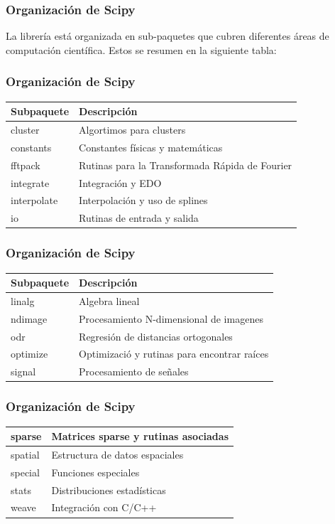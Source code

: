 \documentclass[12pt]{beamer}
\begin{document}
\begin{frame}
\frametitle{Organización de Scipy}
La librería  está organizada en sub-paquetes que cubren diferentes áreas de computación científica. Estos se resumen en la siguiente tabla:
\end{frame}
\begin{frame}
\frametitle{Organización de Scipy}
\fontsize{12}{12}\selectfont
\begin{table}
\renewcommand{\arraystretch}{0.9}
\begin{tabular}{l | l}
	Subpaquete	&	Descripción \\ \hline
	cluster		&	Algortimos para clusters \\ \hline
	constants	&	Constantes físicas y matemáticas \\ \hline
	fftpack 	&	Rutinas para la Transformada Rápida de Fourier \\ \hline
	integrate	&	Integración y EDO \\ \hline
	interpolate	&	Interpolación y uso de splines \\ \hline
	io			&	Rutinas de entrada y salida
\end{tabular}
\end{table}
\end{frame}
\begin{frame}
\frametitle{Organización de Scipy}
\fontsize{12}{12}\selectfont
\begin{table}
\renewcommand{\arraystretch}{0.9}
\begin{tabular}{l | l}
	Subpaquete	&	Descripción \\ \hline
	linalg		&	Algebra lineal \\ \hline
	ndimage		&	Procesamiento N-dimensional de imagenes \\ \hline
	odr			&	Regresión de distancias ortogonales \\ \hline
	optimize	&	Optimizació y rutinas para encontrar raíces \\ \hline
	signal		&	Procesamiento de señales \\ \hline
\end{tabular}
\end{table}
\end{frame}
\begin{frame}
\frametitle{Organización de Scipy}
\fontsize{12}{12}\selectfont
\begin{table}
\renewcommand{\arraystretch}{0.9}
\begin{tabular}{l | l}
    sparse		&	Matrices sparse y rutinas asociadas \\ \hline
    spatial		&	Estructura de datos espaciales \\ \hline
    special		&	Funciones especiales \\ \hline
    stats		&	Distribuciones estadísticas \\ \hline
    weave		&	Integración con C/C++
\end{tabular}
\end{table}
\end{frame}
    
\end{document}
